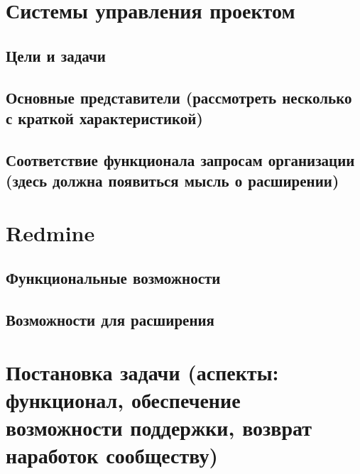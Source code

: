 \section{Системы управления проектом}
\subsection{Цели и задачи}
\subsection{Основные представители (рассмотреть несколько с краткой характеристикой)}
\subsection{Соответствие функционала запросам организации (здесь должна появиться мысль о расширении)}
\section{Redmine}
\subsection{Функциональные возможности}
\subsection{Возможности для расширения}
\section{Постановка задачи (аспекты: функционал, обеспечение возможности поддержки, возврат наработок сообществу)}



